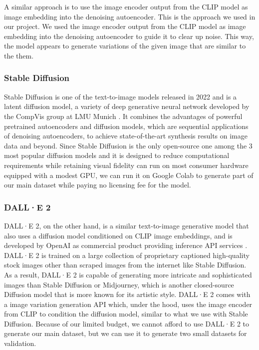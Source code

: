 \documentclass[11pt]{article}
\begin{document}
A similar approach is to use the image encoder output from the CLIP model as image embedding into the denoising autoencoder. This is the approach we used in our project. We used the image encoder output from the CLIP model as image embedding into the denoising autoencoder to guide it to clear up noise. This way, the model appears to generate variations of the given image that are similar to the them.

\subsubsection{Stable Diffusion}

Stable Diffusion is one of the text-to-image models released in 2022 and is a latent diffusion model, a variety of deep generative neural network developed by the CompVis group at LMU Munich \cite{rombach2022high}. It combines the advantages of powerful pretrained autoencoders and diffusion models, which are sequential applications of denoising autoencoders, to achieve state-of-the-art synthesis results on image data and beyond. Since Stable Diffusion is the only open-source one among the 3 most popular diffusion models and it is designed to reduce computational requirements while retaining visual fidelity can run on most consumer hardware equipped with a modest GPU, we can run it on Google Colab to generate part of our main dataset while paying no licensing fee for the model.

\subsubsection{DALL·E 2}

DALL·E 2, on the other hand, is a similar text-to-image generative model that also uses a diffusion model conditioned on CLIP image embeddings, and is developed by OpenAI as commercial product providing inference API services \cite{ramesh2022hierarchical}. DALL·E 2 is trained on a large collection of proprietary captioned high-quality stock images other than scraped images from the internet like Stable Diffusion. As a result, DALL·E 2 is capable of generating more intricate and sophisticated images than Stable Diffusion or Midjourney, which is another closed-source Diffusion model that is more known for its artistic style. DALL·E 2 comes with a image variation generation API which, under the hood, uses the image encoder from CLIP to condition the diffusion model, similar to what we use with Stable Diffusion. Because of our limited budget, we cannot afford to use DALL·E 2 to generate our main dataset, but we can use it to generate two small datasets for validation.
\end{document}
